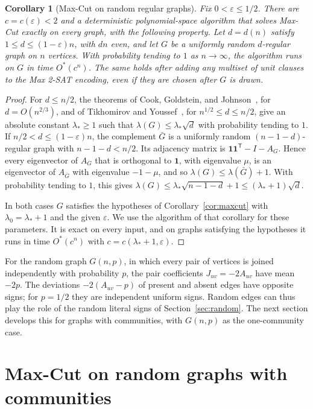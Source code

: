 \documentclass[11pt,a4paper]{article}
\newtheorem{corollary}[theorem]{Corollary}
\theoremstyle{definition}
\theoremstyle{remark}
\newcommand{\Ostar}{O^{*}}
\newcommand{\ind}{\mathbf 1}
\begin{document}
\begin{corollary}[Max-Cut on random regular graphs]\label{cor:random_regular}
Fix $0<\varepsilon\le1/2$. There are $c=c(\varepsilon)<2$ and a
deterministic polynomial-space algorithm that solves Max-Cut exactly on
every graph, with the following property. Let $d=d(n)$ satisfy
$1\le d\le(1-\varepsilon)n$, with $dn$ even, and let $G$ be a uniformly
random $d$-regular graph on $n$ vertices. With probability tending to $1$
as $n\to\infty$, the algorithm runs on $G$ in time $\Ostar(c^n)$. The same
holds after adding any multiset of unit clauses to the Max 2-SAT encoding,
even if they are chosen after $G$ is drawn.
\end{corollary}
\begin{proof}
For $d\le n/2$, the theorems of Cook, Goldstein, and
Johnson~\cite{CGJ18}, for $d=O(n^{2/3})$, and of Tikhomirov and
Youssef~\cite{TY19}, for $n^{1/2}\le d\le n/2$, give an absolute constant
$\lambda_*\ge1$ such that $\lambda(G)\le\lambda_*\sqrt d$ with probability
tending to $1$. If $n/2<d\le(1-\varepsilon)n$, the complement $\bar G$ is a
uniformly random $(n-1-d)$-regular graph with $n-1-d<n/2$. Its adjacency
matrix is $\ind\ind^{\mathsf T}-I-A_G$. Hence every eigenvector of $A_G$
that is orthogonal to $\ind$, with eigenvalue $\mu$, is an eigenvector of
$A_{\bar G}$ with eigenvalue $-1-\mu$, and so
$\lambda(G)\le\lambda(\bar G)+1$. With probability tending to $1$, this
gives $\lambda(G)\le\lambda_*\sqrt{n-1-d}+1\le(\lambda_*+1)\sqrt d$.

In both cases $G$ satisfies the hypotheses of Corollary~\ref{cor:maxcut}
with $\lambda_0=\lambda_*+1$ and the given $\varepsilon$. We use the
algorithm of that corollary for these parameters. It is exact on every
input, and on graphs satisfying the hypotheses it runs in time
$\Ostar(c^n)$ with $c=c(\lambda_*+1,\varepsilon)$.
\end{proof}

For the random graph $G(n,p)$, in which every pair of vertices is joined
independently with probability $p$, the pair coefficients
$J_{uv}=-2A_{uv}$ have mean $-2p$. The deviations $-2(A_{uv}-p)$ of present
and absent edges have opposite signs; for $p=1/2$ they are independent
uniform signs. Random edges can thus play the role of the random literal
signs of Section~\ref{sec:random}. The next section develops this for
graphs with communities, with $G(n,p)$ as the one-community case.


\section{Max-Cut on random graphs with communities}\label{sec:sbm}
\end{document}
